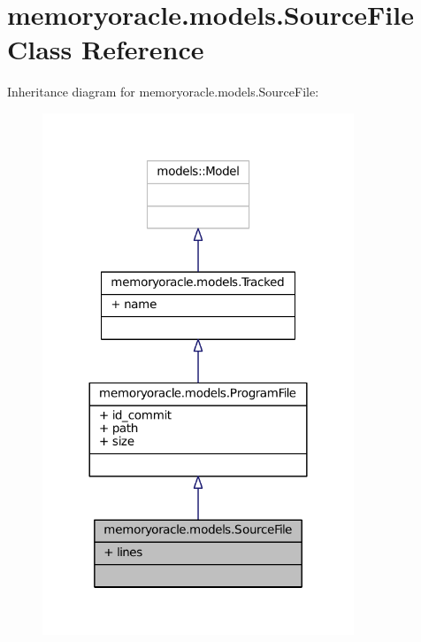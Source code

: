 \hypertarget{classmemoryoracle_1_1models_1_1SourceFile}{}\section{memoryoracle.\+models.\+Source\+File Class Reference}
\label{classmemoryoracle_1_1models_1_1SourceFile}


Inheritance diagram for memoryoracle.\+models.\+Source\+File\+:\nopagebreak
\begin{figure}[H]
\begin{center}
\leavevmode
\includegraphics[width=264pt]{classmemoryoracle_1_1models_1_1SourceFile__inherit__graph}
\end{center}
\end{figure}


